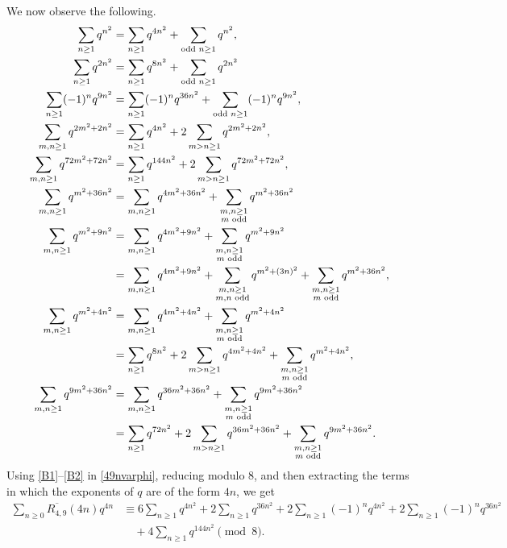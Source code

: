 \documentclass{amsart}
\theoremstyle{definition}
\begin{document}
We now observe the following.
\begin{align}
  \label{B1} \sum_{n\geq1}q^{n^2}&=  \sum_{n\geq1}q^{4n^2}+ \sum_{\text{odd } n\geq1}q^{n^2},\\
\sum_{n\geq1}q^{2n^2}&=\sum_{n\geq1}q^{8n^2}+\sum_{\text{odd }n\geq1}q^{2n^2}\\
   \label{B3}\sum_{n\geq1}(-1)^nq^{9n^2}&=\sum_{n\geq1}(-1)^nq^{36n^2}+\sum_{\text{odd }n\geq1}(-1)^nq^{9n^2},\\
\sum_{m,n\geq1}q^{2m^2+2n^2}&=\sum_{n\geq1}q^{4n^2}+2\sum_{m>n\geq1}q^{2m^2+2n^2},\\
\sum_{m,n\geq1}q^{72m^2+72n^2}&=\sum_{n\geq1}q^{144n^2}+2\sum_{m>n\geq1}q^{72m^2+72n^2},\\
\sum_{m,n\geq1}q^{m^2+36n^2}&=\sum_{m,n\geq1}q^{4m^2+36n^2}+\sum_{\substack{m,n\geq1\\ m \text{ odd}}}q^{m^2+36n^2}\\
\sum_{m,n\geq1}q^{m^2+9n^2}&=\sum_{m,n\geq1}q^{4m^2+9n^2}+\sum_{\substack{m,n\geq1\\m\text{ odd}}}q^{m^2+9n^2}\\
\notag&=\sum_{m,n\geq1}q^{4m^2+9n^2}+\sum_{\substack{m,n\geq1\\m,n \text{ odd}}}q^{m^2+(3n)^2}+\sum_{\substack{m,n\geq1\\m \text{ odd}}}q^{m^2+36n^2},\\
\sum_{m,n\geq1}q^{m^2+4n^2}&=\sum_{m,n\geq1}q^{4m^2+4n^2}+\sum_{\substack{m,n\geq1\\m \text{ odd}}}q^{m^2+4n^2}\\
\notag &=\sum_{n\geq1}q^{8n^2}+2\sum_{m>n\geq1}q^{4m^2+4n^2}+\sum_{\substack{m,n\geq1\\m \text{ odd}}}q^{m^2+4n^2},\\
\label{B2}\sum_{m,n\geq1}q^{9m^2+36n^2}&=\sum_{m,n\geq1}q^{36m^2+36n^2}+\sum_{\substack{m,n\geq1\\m \text{ odd}}}q^{9m^2+36n^2}\\
\notag&=\sum_{n\geq1}q^{72n^2}+2\sum_{m>n\geq1}q^{36m^2+36n^2}+\sum_{\substack{m,n\geq1\\m \text{ odd}}}q^{9m^2+36n^2}.
\end{align}
Using \eqref{B1}--\eqref{B2} in \eqref{49nvarphi}, reducing modulo 8, and then extracting the terms in which the exponents of $q$ are of the form $4n$, we get
\begin{align*}
    \sum_{n\geq0}\overline{R_{4,9}}(4n)q^{4n}&\equiv6\sum_{n\geq1}q^{4n^2}+2\sum_{n\geq1}q^{36n^2}+2\sum_{n\geq1}(-1)^nq^{4n^2}+2\sum_{n\geq1}(-1)^nq^{36n^2}\\
    &\quad+4\sum_{n\geq1}q^{144n^2} \pmod{8}.
\end{align*}
\end{document}

